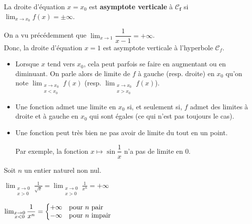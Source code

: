 \documentclass{cornouaille}
\begin{document}
\begin{definition}
  La droite d'équation $x=x_0$ est \textbf{asymptote
    verticale} à $\boldsymbol{\mathcal{C}_f}$ si
  $\lim_{x\to x_0} f(x)=\pm\infty$.
\end{definition}

\begin{exemple}
On a vu précédemment que $\lim_{x\to 1}\dfrac{1}{x-1}=+\infty$.\\
Donc, la droite d'équation $x=1$  est asymptote verticale à l'hyperbole $\mathcal{C}_f$.
\end{exemple}


\begin{remarque}
\begin{itemize}
\item Lorsque $x$ tend vers $x_0$, cela peut parfois se faire en augmentant ou en diminuant. On parle alors de
limite de $f$ à gauche (resp. droite) en $x_0$ qu'on note $ \lim_{\substack{x\to x_0\\ x<x_0}}f(x)$
(resp. $ \lim_{\substack{x\to x_0\\ x>x_0}}f(x)$).
\item Une fonction admet une limite en $x_0$ si, et seulement si, $f$ admet des
 limites à droite et à gauche en $x_0$ qui sont égales (ce qui n'est pas toujours le cas).
\item  Une fonction peut très bien ne pas avoir de limite du tout en un point.\par
Par exemple, la fonction $x \mapsto \sin \dfrac{1}{x}$ n'a pas de limite en 0.
\end{itemize}
\end{remarque}


\begin{propriete}
Soit $n$ un entier naturel non nul.
\begin{colitemize}{2}
\item $\lim_{\substack{x\to 0\\ x>0}}\frac{1}{\sqrt{x}}=\lim_{\substack{x\to 0\\ x>0}}\frac{1}{x^n}=+\infty$
\item $\lim_{\substack{x\to 0\\ x<0}}\dfrac{1}{x^n}=\left\{\begin{array}{@{}ll}
+\infty &  \text{pour~} n \text{~pair} \\
-\infty &  \text{pour~} n \text{~impair}
\end{array}\right.$
\end{colitemize}
\end{propriete}
\end{document}
